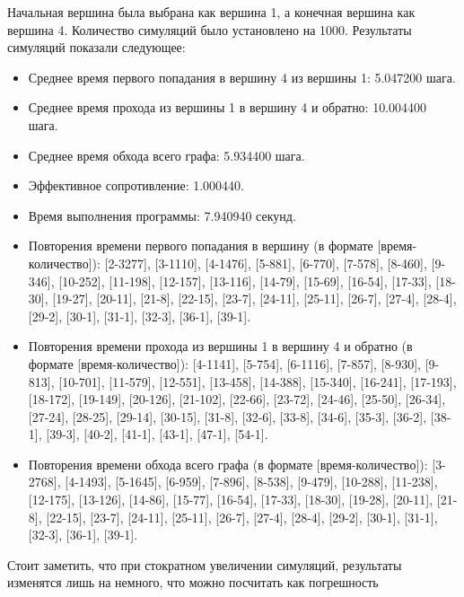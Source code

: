 \documentclass{article}
\begin{document}
Начальная вершина была выбрана как вершина 1, а конечная вершина как вершина 4. Количество симуляций было установлено на 1000. Результаты симуляций показали следующее:

\begin{itemize}
    \item Среднее время первого попадания в вершину 4 из вершины 1: 5.047200 шага.
    \item Среднее время прохода из вершины 1 в вершину 4 и обратно: 10.004400 шага.
    \item Среднее время обхода всего графа: 5.934400 шага.
    \item Эффективное сопротивление: 1.000440.
    \item Время выполнения программы: 7.940940 секунд.
    \item Повторения времени первого попадания в вершину (в формате [время-количество]):
[2-3277], [3-1110], [4-1476], [5-881], [6-770], [7-578], [8-460], [9-346], [10-252], [11-198], [12-157], [13-116], [14-79], [15-69], [16-54], [17-33], [18-30], [19-27], [20-11], [21-8], [22-15], [23-7], [24-11], [25-11], [26-7], [27-4], [28-4], [29-2], [30-1], [31-1], [32-3], [36-1], [39-1].
    \item Повторения времени прохода из вершины 1 в вершину 4 и обратно (в формате [время-количество]):
[4-1141], [5-754], [6-1116], [7-857], [8-930], [9-813], [10-701], [11-579], [12-551], [13-458], [14-388], [15-340], [16-241], [17-193], [18-172], [19-149], [20-126], [21-102], [22-66], [23-72], [24-46], [25-50], [26-34], [27-24], [28-25], [29-14], [30-15], [31-8], [32-6], [33-8], [34-6], [35-3], [36-2], [38-1], [39-3], [40-2], [41-1], [43-1], [47-1], [54-1].
    \item Повторения времени обхода всего графа (в формате [время-количество]):
[3-2768], [4-1493], [5-1645], [6-959], [7-896], [8-538], [9-479], [10-288], [11-238], [12-175], [13-126], [14-86], [15-77], [16-54], [17-33], [18-30], [19-28], [20-11], [21-8], [22-15], [23-7], [24-11], [25-11], [26-7], [27-4], [28-4], [29-2], [30-1], [31-1], [32-3], [36-1], [39-1].
\end{itemize}
Стоит заметить, что при стократном увеличении симуляций, результаты изменятся лишь на немного, что можно посчитать как погрешность
\end{document}
